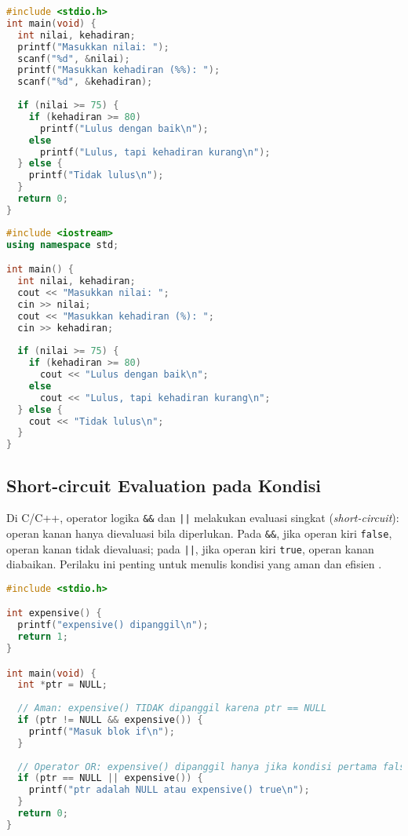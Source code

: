 \documentclass[../main.tex]{subfiles}
\begin{document}
\begin{lstlisting}[language=C, caption={Nested if di C}]
#include <stdio.h>
int main(void) {
  int nilai, kehadiran;
  printf("Masukkan nilai: ");
  scanf("%d", &nilai);
  printf("Masukkan kehadiran (%%): ");
  scanf("%d", &kehadiran);
  
  if (nilai >= 75) {
    if (kehadiran >= 80)
      printf("Lulus dengan baik\n");
    else
      printf("Lulus, tapi kehadiran kurang\n");
  } else {
    printf("Tidak lulus\n");
  }
  return 0;
}
\end{lstlisting}

\begin{lstlisting}[language=C++, caption={Nested if di C++}]
#include <iostream>
using namespace std;

int main() {
  int nilai, kehadiran;
  cout << "Masukkan nilai: ";
  cin >> nilai;
  cout << "Masukkan kehadiran (%): ";
  cin >> kehadiran;
  
  if (nilai >= 75) {
    if (kehadiran >= 80)
      cout << "Lulus dengan baik\n";
    else
      cout << "Lulus, tapi kehadiran kurang\n";
  } else {
    cout << "Tidak lulus\n";
  }
}
\end{lstlisting}

\subsection{Short-circuit Evaluation pada Kondisi}
Di C/C++, operator logika \texttt{\&\&} dan \texttt{||} melakukan evaluasi singkat (\emph{short-circuit}): operan kanan hanya dievaluasi bila diperlukan. Pada \texttt{\&\&}, jika operan kiri \texttt{false}, operan kanan tidak dievaluasi; pada \texttt{||}, jika operan kiri \texttt{true}, operan kanan diabaikan. Perilaku ini penting untuk menulis kondisi yang aman dan efisien \parencite{gnu-c-manual,cpp-reference}.

\begin{lstlisting}[language=C, caption={Short-circuit di C untuk keamanan}]
#include <stdio.h>

int expensive() {
  printf("expensive() dipanggil\n");
  return 1;
}

int main(void) {
  int *ptr = NULL;
  
  // Aman: expensive() TIDAK dipanggil karena ptr == NULL
  if (ptr != NULL && expensive()) {
    printf("Masuk blok if\n");
  }
  
  // Operator OR: expensive() dipanggil hanya jika kondisi pertama false
  if (ptr == NULL || expensive()) {
    printf("ptr adalah NULL atau expensive() true\n");
  }
  return 0;
}
\end{lstlisting}
\end{document}
